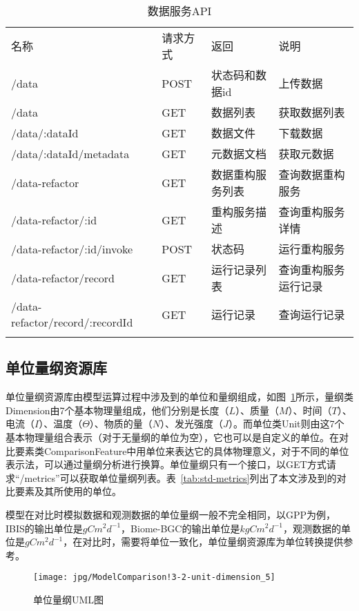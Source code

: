 \begin{table}[!htbp]
    \centering
    \caption{数据服务API}
    \label{tab:data-service-API}
    \begin{tabular}{llll}
        \Xhline{1.5pt}
        名称 & 请求方式 & 返回 & 说明 \\
        \Xhline{1.5pt}
        /data & POST & 状态码和数据id & 上传数据 \\
        /data & GET & 数据列表 & 获取数据列表 \\
        /data/:dataId & GET & 数据文件 & 下载数据 \\
        /data/:dataId/metadata & GET & 元数据文档 & 获取元数据 \\
        /data-refactor & GET & 数据重构服务列表 & 查询数据重构服务 \\
        /data-refactor/:id & GET & 重构服务描述 & 查询重构服务详情 \\
        /data-refactor/:id/invoke & POST & 状态码 & 运行重构服务 \\
        /data-refactor/record & GET & 运行记录列表 & \multicolumn{1}{m{0.3\columnwidth}}{查询重构服务运行记录} \\
        /data-refactor/record/:recordId & GET & 运行记录 & 查询运行记录 \\
        \Xhline{1.5pt}
    \end{tabular}
\end{table}

\subsection{单位量纲资源库}
单位量纲资源库由模型运算过程中涉及到的单位和量纲组成，如图~\ref{fig:ModelComparison!3-2-unit-dimension_5}所示，量纲类Dimension由7个基本物理量组成，他们分别是长度（$L$）、质量（$M$）、时间（$T$）、电流（$I$）、温度（$\Theta$）、物质的量（$N$）、发光强度（$J$）。而单位类Unit则由这7个基本物理量组合表示（对于无量纲的单位为空），它也可以是自定义的单位。在对比要素类ComparisonFeature中用单位来表达它的具体物理意义，对于不同的单位表示法，可以通过量纲分析进行换算。单位量纲只有一个接口，以GET方式请求“/metrics”可以获取单位量纲列表。表~\ref{tab:std-metrics}列出了本文涉及到的对比要素及其所使用的单位。

模型在对比时模拟数据和观测数据的单位量纲一般不完全相同，以GPP为例，IBIS的输出单位是$gC m^2 d^{-1}$，Biome-BGC的输出单位是$kgC m^2 d^{-1}$，观测数据的单位是$gC m^2 d^{-1}$，在对比时，需要将单位一致化，单位量纲资源库为单位转换提供参考。

\begin{figure}[!htbp]
    \centering
    \texttt{[image: jpg/ModelComparison!3-2-unit-dimension\_5]}
    \caption{单位量纲UML图}
    \label{fig:ModelComparison!3-2-unit-dimension_5}
\end{figure}

